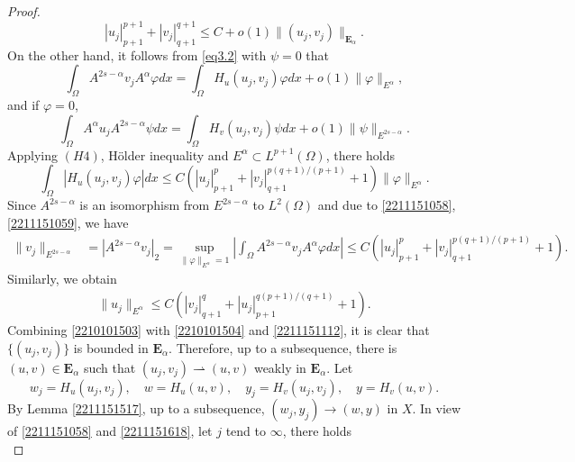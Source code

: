 \documentclass[10pt]{article}
\numberwithin{equation}{section}
\numberwithin{equation}{section}
\begin{document}
\begin{proof}
\begin{equation}
|u_j|_{p+1}^{p+1}+|v_j|_{q+1}^{q+1} \leq C+ o(1)\|(u_j, v_j)\|_{\mathbf{E}_{\alpha}}.
\end{equation}
On the other hand, it follows from \eqref{eq3.2} with $\psi=0$ that
\begin{equation}\label{2211151058}
 \int_{\Omega}A^{2s-\alpha}v_jA^{\alpha}\varphi dx = \int_{\Omega}H_u(u_j, v_j) \varphi  dx+o(1)\|\varphi\|_{E^\alpha},
\end{equation}
and if $\varphi=0$,
\begin{equation}\label{2211151618}
 \int_{\Omega}A^{\alpha}u_jA^{2s-\alpha}\psi dx  = \int_{\Omega}H_v(u_j, v_j) \psi dx+o(1)\|\psi\|_{E^{2s-\alpha}}.
\end{equation}
Applying $(H4)$, H\"older inequality and $E^{\alpha}\subset L^{p+1}(\Omega)$, there holds
\begin{equation}\label{2211151059}
\int_{\Omega}\left|H_u(u_j, v_j) \varphi \right| dx\le C\left( |u_j|_{p+1}^p+|v_j|_{q+1}^{p(q+1)/(p+1)} + 1\right)\|\varphi\|_{E^\alpha}.
\end{equation}
Since $A^{2s-\alpha}$ is an isomorphism from $E^{2s-\alpha}$ to $L^2(\Omega)$ and due to \eqref{2211151058}, \eqref{2211151059}, we have
\begin{equation}\label{2210101504}
\begin{aligned}
\|v_j\|_{E^{2s-\alpha}}& = |A^{2s-\alpha}v_j |_2=  \underset{ \|\varphi\|_{E^{\alpha}}=1}{\sup} \left| \int_{\Omega}A^{2s-\alpha}v_j A^{\alpha}\varphi dx  \right| \le C\left( |u_j|_{p+1}^p+|v_j|_{q+1}^{p(q+1)/(p+1)}+1\right).
\end{aligned}
\end{equation}
Similarly, we obtain
\begin{equation}\label{2211151112}
\begin{aligned}
\|u_j\|_{E^{\alpha}} \le C\left( |v_j|_{q+1}^q+|u_j|_{p+1}^{q(p+1)/(q+1)}+1\right).
\end{aligned}
\end{equation}
Combining \eqref{2210101503} with \eqref{2210101504} and \eqref{2211151112}, it is clear that $\{(u_j, v_j)\}$ is bounded in $\mathbf{E}_{\alpha}$. Therefore, up to a subsequence, there is $(u, v)\in \mathbf{E}_{\alpha}$ such that $(u_j, v_j) \rightharpoonup (u, v)$ weakly in $\mathbf{E}_{\alpha}$. Let
\[
w_j=H_u(u_j, v_j),\quad w=H_u(u, v),\quad y_j=H_v(u_j, v_j),\quad y=H_v(u, v).
\]
By Lemma \ref{2211151517}, up to a subsequence, $(w_j, y_j)\to (w, y)$ in $X$. In view of \eqref{2211151058} and \eqref{2211151618}, let $j$ tend to $\infty$, there holds
\begin{equation}\label{2211151817}

\end{equation}
\end{proof}
\end{document}
